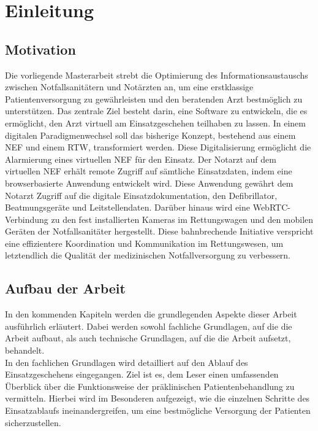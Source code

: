 \chapter{Einleitung}


\section{Motivation}
Die vorliegende Masterarbeit strebt die Optimierung des Informationsaustauschs zwischen Notfallsanitätern und Notärzten an, um eine erstklassige Patientenversorgung zu gewährleisten und den beratenden Arzt bestmöglich zu unterstützen. Das zentrale Ziel besteht darin, eine Software zu entwickeln, die es ermöglicht, den Arzt virtuell am Einsatzgeschehen teilhaben zu lassen. In einem digitalen Paradigmenwechsel soll das bisherige Konzept, bestehend aus einem \ac{NEF} und einem \ac{RTW}, transformiert werden. Diese Digitalisierung ermöglicht die Alarmierung eines virtuellen NEF für den Einsatz. Der Notarzt auf dem virtuellen NEF erhält remote Zugriff auf sämtliche Einsatzdaten, indem eine browserbasierte Anwendung entwickelt wird. Diese Anwendung gewährt dem Notarzt Zugriff auf die digitale Einsatzdokumentation, den Defibrillator, Beatmungsgeräte und Leitstellendaten. Darüber hinaus wird eine WebRTC-Verbindung zu den fest installierten Kameras im Rettungswagen und den mobilen Geräten der Notfallsanitäter hergestellt. Diese bahnbrechende Initiative verspricht eine effizientere Koordination und Kommunikation im Rettungswesen, um letztendlich die Qualität der medizinischen Notfallversorgung zu verbessern.


\section{Aufbau der Arbeit}

In den kommenden Kapiteln werden die grundlegenden Aspekte dieser Arbeit ausführlich erläutert. Dabei werden sowohl fachliche Grundlagen, auf die die Arbeit aufbaut, als auch technische Grundlagen, auf die die Arbeit aufsetzt, behandelt. \\

In den fachlichen Grundlagen wird detailliert auf den Ablauf des Einsatzgeschehens eingegangen. Ziel ist es, dem Leser einen umfassenden Überblick über die Funktionsweise der präklinischen Patientenbehandlung zu vermitteln. Hierbei wird im Besonderen aufgezeigt, wie die einzelnen Schritte des Einsatzablaufs ineinandergreifen, um eine bestmögliche Versorgung der Patienten sicherzustellen. \\

